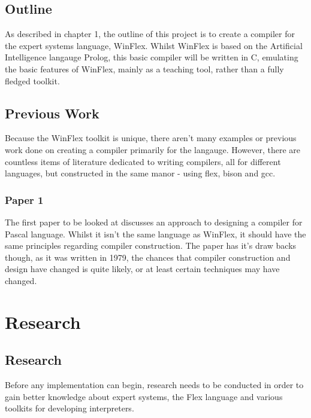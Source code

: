\documentclass[12pt]{report}
\begin{document}
\section{Outline}\label{sec:outline}
As described in chapter 1, the outline of this project is to create a compiler for the expert systems language, WinFlex.  Whilst WinFlex is based on the Artificial Intelligence langauge Prolog, this basic compiler will be written in C, emulating the basic features of WinFlex, mainly as a teaching tool, rather than a fully fledged toolkit.

\section{Previous Work}\label{sec:previous_work}
Because the WinFlex toolkit is unique, there aren't many examples or previous work done on creating a compiler primarily for the langauge.  However, there are countless items of literature dedicated to writing compilers, all for different languages, but constructed in the same manor - using flex, bison and gcc.

\subsection{Paper 1}\label{subsec:paper1}
The first paper to be looked at discusses an approach to designing a compiler for Pascal language.  Whilst it isn't the same language as WinFlex, it should have the same principles regarding compiler construction.  The paper has it's draw backs though, as it was written in 1979, the chances that compiler construction and design have changed is quite likely, or at least certain techniques may have changed.

\chapter{Research}
\section[Research]{Research}\label{sec:intro_to_research}
Before any implementation can begin, research needs to be conducted in order to gain better knowledge about expert systems, the Flex language and various toolkits for developing interpreters.
\end{document}
